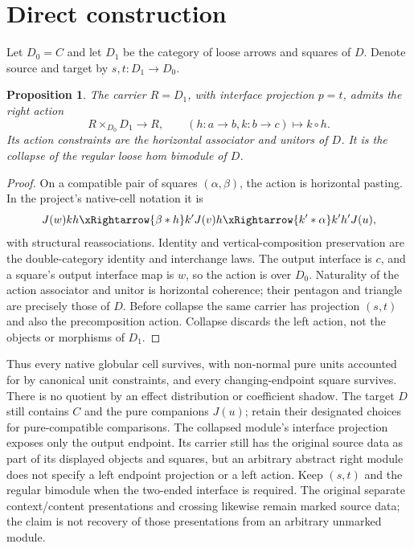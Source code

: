 \documentclass{article}
\newtheorem{proposition}{Proposition}
\begin{document}
\section{Direct construction}
Let $D_0=C$ and let $D_1$ be the category of loose arrows and squares of $D$. Denote source and target by $s,t:D_1\to D_0$.
\begin{proposition}
The carrier $R=D_1$, with interface projection $p=t$, admits the right action
\[R\times_{D_0}D_1\longrightarrow R,\qquad (h:a\to b,k:b\to c)\longmapsto k\circ h.\]
Its action constraints are the horizontal associator and unitors of $D$. It is the collapse of the regular loose hom bimodule of $D$.
\end{proposition}
\begin{proof}
On a compatible pair of squares $(\alpha,\beta)$, the action is horizontal pasting. In the project's native-cell notation it is
\[J(w)kh\xRightarrow{\beta*h}k'J(v)h\xRightarrow{k'*\alpha}k'h'J(u),\]
with structural reassociations. Identity and vertical-composition preservation are the double-category identity and interchange laws. The output interface is $c$, and a square's output interface map is $w$, so the action is over $D_0$. Naturality of the action associator and unitor is horizontal coherence; their pentagon and triangle are precisely those of $D$. Before collapse the same carrier has projection $(s,t)$ and also the precomposition action. Collapse discards the left action, not the objects or morphisms of $D_1$.
\end{proof}

Thus every native globular cell survives, with non-normal pure units accounted for by canonical unit constraints, and every changing-endpoint square survives. There is no quotient by an effect distribution or coefficient shadow. The target $D$ still contains $C$ and the pure companions $J(u)$; retain their designated choices for pure-compatible comparisons. The collapsed module's interface projection exposes only the output endpoint. Its carrier still has the original source data as part of its displayed objects and squares, but an arbitrary abstract right module does not specify a left endpoint projection or a left action. Keep $(s,t)$ and the regular bimodule when the two-ended interface is required. The original separate context/content presentations and crossing likewise remain marked source data; the claim is not recovery of those presentations from an arbitrary unmarked module.
\end{document}
